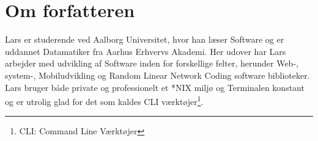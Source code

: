 \section*{Om forfatteren}
Lars er studerende ved Aalborg Universitet, hvor han læser Software og er uddannet Datamatiker fra Aarhus Erhvervs Akademi. Her udover har Lars arbejder med udvikling af Software inden for forskellige felter, herunder Web-, system-, Mobiludvikling og Random Linear Network Coding software biblioteker. Lars bruger både private og professionelt et *NIX miljø og Terminalen konstant og er utrolig glad for det som kaldes CLI værktøjer\footnote{CLI: Command Line Værktøjer}.